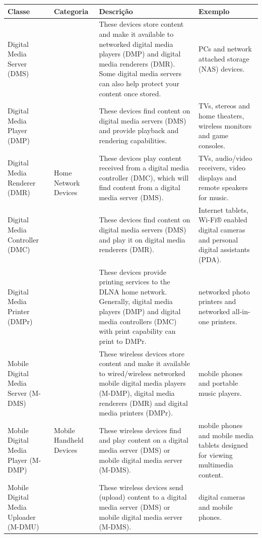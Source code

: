 \begin{table}
	\begin{center}
		\begin{tabular}{llll}
		\hline
		\textbf{Classe} & \textbf{Categoria} & \textbf{Descrição} & \textbf{Exemplo}						\\
		\hline
		Digital Media Server (DMS) & \multirow{5}{*}{Home Network Devices} & These devices store content and make it available to networked digital media players (DMP) and digital media renderers (DMR). Some digital media servers can also help protect your content once stored. & PCs and network attached storage (NAS) devices.	\\
		\hline
		Digital Media Player (DMP) & & These devices find content on digital media servers (DMS) and provide playback and rendering capabilities. & TVs, stereos and home theaters, wireless monitors and game consoles. \\
		\hline
		Digital Media Renderer (DMR) & & These devices play content received from a digital media controller (DMC), which will find content from a digital media server (DMS). & TVs, audio/video receivers, video displays and remote speakers for music. \\
		\hline
		Digital Media Controller (DMC) & & These devices find content on digital media servers (DMS) and play it on digital media renderers (DMR). & Internet tablets, Wi-Fi® enabled digital cameras and personal digital assistants (PDA).\\
		\hline
		Digital Media Printer (DMPr) & & These devices provide printing services to the DLNA home network. Generally, digital media players (DMP) and digital media controllers (DMC) with print capability can print to DMPr. & networked photo printers and networked all-in-one printers.\\
		\hline
		Mobile Digital Media Server (M-DMS) & \multirow{5}{*}{Mobile Handheld Devices} & These wireless devices store content and make it available to wired/wireless networked mobile digital media players (M-DMP), digital media renderers (DMR) and digital media printers (DMPr). & mobile phones and portable music players.\\
		\hline
		Mobile Digital Media Player (M-DMP) & & These wireless devices find and play content on a digital media server (DMS) or mobile digital media server (M-DMS). & mobile phones and mobile media tablets designed for viewing multimedia content.\\
		\hline
		Mobile Digital Media Uploader (M-DMU) & & These wireless devices send (upload) content to a digital media server (DMS) or mobile digital media server (M-DMS). & digital cameras and mobile phones.\\

\end{tabular}
\end{center}
\end{table}

